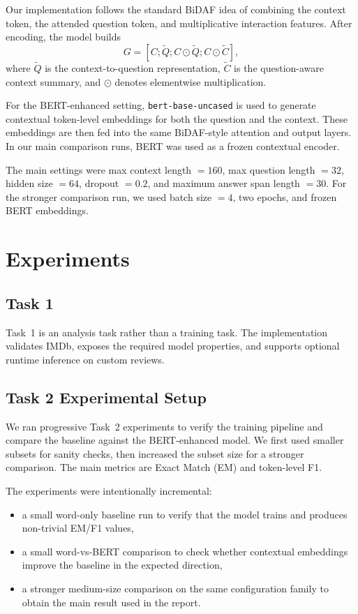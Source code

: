 \documentclass[10pt]{article}
\begin{document}
Our implementation follows the standard BiDAF idea of combining the context token, the attended question token, and multiplicative interaction features. After encoding, the model builds
\[
G = [C;\tilde{Q};C \odot \tilde{Q};C \odot \tilde{C}],
\]
where $\tilde{Q}$ is the context-to-question representation, $\tilde{C}$ is the question-aware context summary, and $\odot$ denotes elementwise multiplication.

For the BERT-enhanced setting, \texttt{bert-base-uncased} is used to generate contextual token-level embeddings for both the question and the context. These embeddings are then fed into the same BiDAF-style attention and output layers. In our main comparison runs, BERT was used as a frozen contextual encoder.

The main settings were max context length $=160$, max question length $=32$, hidden size $=64$, dropout $=0.2$, and maximum answer span length $=30$. For the stronger comparison run, we used batch size $=4$, two epochs, and frozen BERT embeddings.

\section{Experiments}
\subsection{Task 1}
Task~1 is an analysis task rather than a training task. The implementation validates IMDb, exposes the required model properties, and supports optional runtime inference on custom reviews.

\subsection{Task 2 Experimental Setup}
We ran progressive Task~2 experiments to verify the training pipeline and compare the baseline against the BERT-enhanced model. We first used smaller subsets for sanity checks, then increased the subset size for a stronger comparison. The main metrics are Exact Match (EM) and token-level F1.

The experiments were intentionally incremental:
\begin{itemize}
\item a small word-only baseline run to verify that the model trains and produces non-trivial EM/F1 values,
\item a small word-vs-BERT comparison to check whether contextual embeddings improve the baseline in the expected direction,
\item a stronger medium-size comparison on the same configuration family to obtain the main result used in the report.
\end{itemize}
\end{document}
